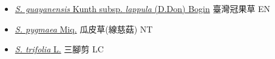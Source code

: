 \begin{itemize}
  \begin{itemize}
        \item[] \href{http://www.theplantlist.org/tpl1.1/search?q=Sagittaria+guayanensis+subsp.+lappula}{\textit{S. guayanensis} Kunth subsp. \textit{lappula} (D.Don) Bogin}   臺灣冠果草   EN
        \item[] \href{http://www.theplantlist.org/tpl1.1/search?q=Sagittaria+pygmaea}{\textit{S. pygmaea} Miq.}   瓜皮草(線慈菇)   NT
        \item[] \href{http://www.theplantlist.org/tpl1.1/search?q=Sagittaria+trifolia}{\textit{S. trifolia} L.}   三腳剪   LC
  \end{itemize}
  \end{itemize}
